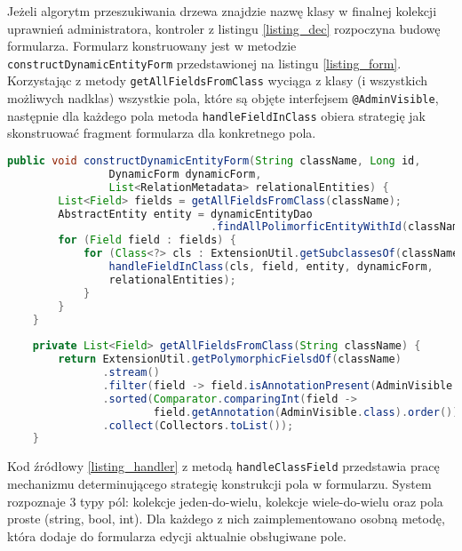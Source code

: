 Jeżeli algorytm przeszukiwania drzewa znajdzie nazwę klasy w finalnej kolekcji uprawnień administratora, kontroler z listingu \ref{listing_dec} rozpoczyna budowę formularza. Formularz konstruowany jest w metodzie \texttt{constructDynamicEntityForm} przedstawionej na listingu \ref{listing_form}. Korzystając z metody \texttt{getAllFieldsFromClass} wyciąga z klasy (i wszystkich możliwych nadklas) wszystkie pola, które są objęte interfejsem \texttt{@AdminVisible}, następnie dla każdego pola metoda \texttt{handleFieldInClass} obiera strategię jak skonstruować fragment formularza dla konkretnego pola.
\newpage
\begin{small}
	\begin{lstlisting}[language=Java, frame=lines, numberstyle=\tiny, stepnumber=5, caption=Konstrukcja formularza: \texttt{DynamicEntityService.java}\label{listing_form}., firstnumber=1]
	public void constructDynamicEntityForm(String className, Long id,     
	            DynamicForm dynamicForm, 
	            List<RelationMetadata> relationalEntities) {
	    List<Field> fields = getAllFieldsFromClass(className);
	    AbstractEntity entity = dynamicEntityDao
	                            .findAllPolimorficEntityWithId(className, id);
	    for (Field field : fields) {
	        for (Class<?> cls : ExtensionUtil.getSubclassesOf(className)) {
	            handleFieldInClass(cls, field, entity, dynamicForm, 
	            relationalEntities);
	        } 
	    }
	}
	
	private List<Field> getAllFieldsFromClass(String className) {
	    return ExtensionUtil.getPolymorphicFielsdOf(className)
	           .stream()
	           .filter(field -> field.isAnnotationPresent(AdminVisible.class))
	           .sorted(Comparator.comparingInt(field -> 
	                   field.getAnnotation(AdminVisible.class).order()))
	           .collect(Collectors.toList());
	}
	\end{lstlisting} 
\end{small}

Kod źródłowy \ref{listing_handler} z metodą \texttt{handleClassField} przedstawia pracę mechanizmu determinującego strategię konstrukcji pola w formularzu. System rozpoznaje 3 typy pól: kolekcje jeden-do-wielu, kolekcje wiele-do-wielu oraz pola proste (string, bool, int). Dla każdego z nich zaimplementowano osobną metodę, która dodaje do formularza edycji aktualnie obsługiwane pole.
 
